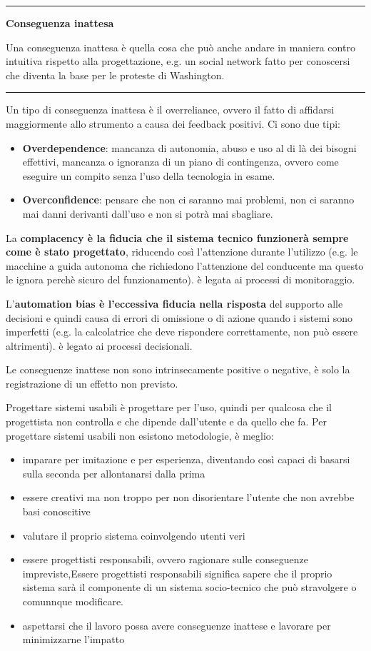 \documentclass[11pt,a4paper]{book}
\begin{document}
\noindent\rule{\textwidth}{1pt}
\begin{center}
	\textbf{Conseguenza inattesa}
\end{center}

Una conseguenza inattesa è quella cosa che può anche andare in maniera contro intuitiva rispetto alla progettazione, e.g. un social network fatto per conoscersi che diventa la base per le proteste di Washington.

\noindent\rule{\textwidth}{1pt}

Un tipo di conseguenza inattesa è il overreliance, ovvero il fatto di affidarsi maggiormente allo strumento a causa dei feedback positivi. Ci sono due tipi:
\begin{itemize}
	\item \textbf{Overdependence}: mancanza di autonomia, abuso e uso al di là dei bisogni effettivi, mancanza o ignoranza di un piano di contingenza, ovvero come eseguire un compito senza l'uso della tecnologia in esame.
	\item \textbf{Overconfidence}: pensare che non ci saranno mai problemi, non ci saranno mai danni derivanti dall'uso e non si potrà mai sbagliare.
\end{itemize}

La \textbf{complacency è la fiducia che il sistema tecnico funzionerà sempre come è stato progettato}, riducendo così l'attenzione durante l'utilizzo (e.g. le macchine a guida autonoma che richiedono l'attenzione del conducente ma questo le ignora perchè sicuro del funzionamento). è legata ai processi di monitoraggio.

L'\textbf{automation bias è l'eccessiva fiducia nella risposta} del supporto alle decisioni e quindi causa di errori di omissione o di azione quando i sistemi sono imperfetti (e.g. la calcolatrice che deve rispondere correttamente, non può essere altrimenti). è legato ai processi decisionali.

Le conseguenze inattese non sono intrinsecamente positive o negative, è solo la registrazione di un effetto non previsto.


Progettare sistemi usabili è progettare per l'uso, quindi per qualcosa che il progettista non controlla e che dipende dall'utente e da quello che fa. Per progettare sistemi usabili non esistono metodologie, è meglio:
\begin{itemize}
	\item imparare per imitazione e per esperienza, diventando così capaci di basarsi sulla seconda per allontanarsi dalla prima
	\item essere creativi ma non troppo per non disorientare l'utente che non avrebbe basi conoscitive
	\item valutare il proprio sistema coinvolgendo utenti veri
	\item essere progettisti responsabili, ovvero ragionare sulle conseguenze impreviste,Essere progettisti responsabili significa sapere che il proprio sistema sarà il componente di un sistema socio-tecnico che può stravolgere o comunnque modificare.
	\item aspettarsi che il lavoro possa avere conseguenze inattese e lavorare per minimizzarne l'impatto
\end{itemize}
\end{document}
